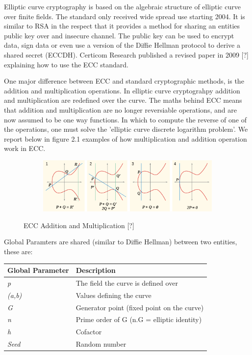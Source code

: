 \documentclass[bsc,frontabs,twoside,singlespacing,parskip,deptreport]{infthesis}     %
\begin{document}
Elliptic curve cryptography is based on the algebraic structure of elliptic curve over finite fields. The standard only received wide spread use starting 2004. It is similar to RSA in the respect that it provides a method for sharing an entities public key over and insecure channel. The public key can be used to encrypt data, sign data or even use a version of the Diffie Hellman protocol to derive a shared secret (ECCDH). Certicom Research published a revised paper in 2009 [?] explaining how to use the ECC standard.

One major difference between ECC and standard cryptographic methods, is the addition and multiplication operations. In elliptic curve cryptograhpy addition and multiplication are redefined over the curve. The maths behind ECC means that addition and multiplication are no longer reversiable operations, and are now assumed to be one way functions. In which to compute the reverse of one of the operations, one must solve the 'elliptic curve discrete logarithm problem'. We report below in figure 2.1 examples of how multiplication and addition operation work in ECC.
\begin{figure}[H]
\centering
\begin{subfigure}{1.2\textwidth}
  \includegraphics[width=1\linewidth]
  {images/crypto/ecc.png}
\end{subfigure}
\caption{ECC Addition and Multiplication [?]}
\end{figure}

Global Paramters are shared (similar to Diffie Hellman) between two entities, these are:
\begin{table}[H]
\begin{tabular}{|l|l|}
\hline
Global Parameter & Description\\
\hline
\textit{p} & The field the curve is defined over\\
\hline
\textit{(a,b)} & Values defining the curve\\
\hline
\textit{G} & Generator point (fixed point on the curve)\\
\hline
\textit{n} & Prime order of G (n.G = elliptic identity)\\
\hline
\textit{h} & Cofactor\\
\hline
\textit{Seed} & Random number\\
\hline
\end{tabular}
\end{table}
\end{document}
